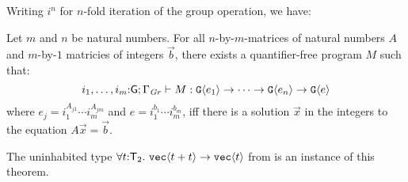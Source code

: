 Writing $i^n$ for $n$-fold iteration of the group operation, we have:
\begin{theorem}
  Let $m$ and $n$ be natural numbers. For all $n$-by-$m$-matrices of
  natural numbers $A$ and $m$-by-$1$ matricies of integers $\vec{b}$,
  there exists a quantifier-free program $M$ such that:
  \begin{displaymath}
    i_1,\dots,i_m\mathord:\mathsf{G}; \Gamma_{\mathit{Gr}} \vdash M : \textup{\texttt{G}}\langle e_1 \rangle \to \dots \to \textup{\texttt{G}}\langle e_n \rangle \to \textup{\texttt{G}}\langle e \rangle
  \end{displaymath}
  where $e_j = i_1^{A_{j1}}\cdots i_m^{A_{jm}}$ and $e = i_1^{b_1}\cdots i_m^{b_m}$, iff there is a solution $\vec{x}$
  in the integers to the equation $A \vec x = \vec{b}$.
\end{theorem}
The uninhabited type $\forall t \mathord: \mathsf{T}_2.\
\textup{\texttt{vec}}\langle t + t \rangle \to \textup{\texttt{vec}}\langle t \rangle$ from
 is an instance of this theorem.  


